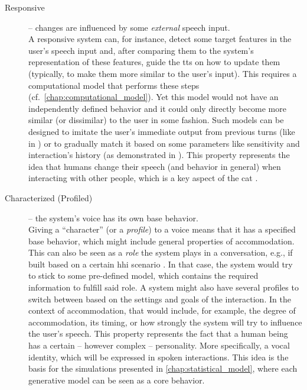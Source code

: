 \begin{description}
	\item[Responsive] -- changes are influenced by some \emph{external} speech input.\\
	A responsive system can, for instance, detect some target features in the user's speech input and, after comparing them to the system's representation of these features, guide the \ac{tts} on how to update them (typically, to make them more similar to the user's input).
	This requires a computational model that performs these steps (cf.\ \cref{chap:computational_model}).
	Yet this model would not have an independently defined behavior and it could only directly become more similar (or dissimilar) to the user in some fashion.
	Such models can be designed to imitate the user's immediate output from previous turns (like in \citet{Levitan2016implementing}) or to gradually match it based on some parameters like sensitivity and interaction's history (as demonstrated in \citet{Raveh2017Interspeech}).
	This property represents the idea that humans change their speech (and behavior in general) when interacting with other people, which is a key aspect of the \ac{cat} \citep[][and see \cref{sec:communication_accommodation_theory}]{Giles1991CAT}.
	
	\item[Characterized (Profiled)] -- the system's voice has its own base behavior.\\
	Giving a \enquote{character} (or a \emph{profile}) to a voice means that it has a specified base behavior, which might include general properties of accommodation.
	This can also be seen as a \emph{role} the system plays in a conversation, e.g., if built based on a certain \ac{hhi} scenario \citep{Silber-Varod2018prosodic}.
	In that case, the system would try to stick to some pre-defined model, which contains the required information to fulfill said role.
	A system might also have several profiles to switch between based on the settings and goals of the interaction.
	In the context of accommodation, that would include, for example, the degree of accommodation, its timing, or how strongly the system will try to influence the user's speech.
	This property represents the fact that a human being has a certain -- however complex -- personality.
	More specifically, a vocal identity, which will be expressed in spoken interactions.
	This idea is the basis for the simulations presented in \cref{chap:statistical_model}, where each generative model can be seen as a core behavior.
	

\end{description}

